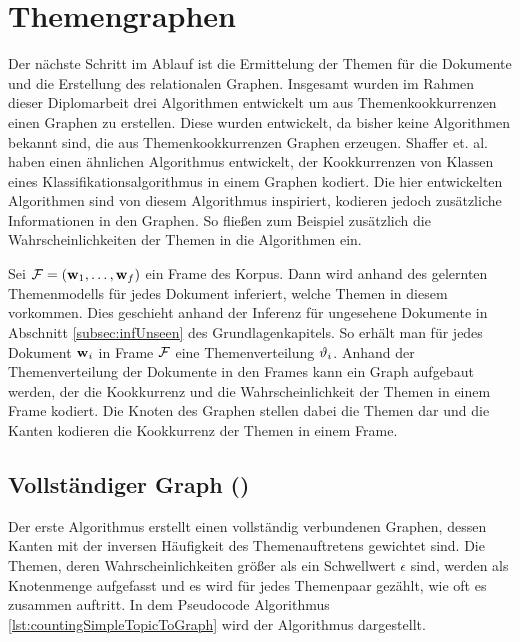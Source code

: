 	\section{Themengraphen}
\label{sec:topic2graph}
Der nächste Schritt im Ablauf ist die Ermittelung der Themen für die Dokumente und die Erstellung des relationalen Graphen. Insgesamt wurden im Rahmen dieser Diplomarbeit drei Algorithmen entwickelt um aus Themenkookkurrenzen einen Graphen zu erstellen. Diese wurden entwickelt, da bisher keine Algorithmen bekannt sind, die aus Themenkookkurrenzen Graphen erzeugen. Shaffer et. al. \citep{shafferEpistemicFrames} haben einen ähnlichen Algorithmus entwickelt, der Kookkurrenzen von Klassen eines Klassifikationsalgorithmus in einem Graphen kodiert. Die hier entwickelten Algorithmen sind von diesem Algorithmus inspiriert, kodieren jedoch zusätzliche Informationen in den Graphen. So fließen zum Beispiel zusätzlich die Wahrscheinlichkeiten der Themen in die Algorithmen ein.  

Sei $\mathcal{F}=(\mathbf{w}_1,\ldots,\mathbf{w}_f)$ ein Frame des Korpus. Dann wird anhand des gelernten Themenmodells für jedes Dokument inferiert, welche Themen in diesem vorkommen. Dies geschieht anhand der Inferenz für ungesehene Dokumente in Abschnitt \ref{subsec:infUnseen} des Grundlagenkapitels. So erhält man für jedes Dokument $\mathbf{w}_i$ in Frame $\mathcal{F}$ eine Themenverteilung $\vartheta_{i}$. Anhand der Themenverteilung der Dokumente in den Frames kann ein Graph aufgebaut werden, der die Kookkurrenz und die Wahrscheinlichkeit der Themen in einem Frame kodiert. Die Knoten des Graphen stellen dabei die Themen dar und die Kanten kodieren die Kookkurrenz der Themen in einem Frame. 

\subsection{Vollständiger Graph (\CST)}
\label{subsec:cst}
Der erste Algorithmus erstellt einen vollständig verbundenen Graphen, dessen Kanten mit der inversen Häufigkeit des Themenauftretens gewichtet sind. Die Themen, deren Wahrscheinlichkeiten größer als ein Schwellwert $\epsilon$ sind, werden als Knotenmenge aufgefasst und es wird für jedes Themenpaar gezählt, wie oft es zusammen auftritt. In dem Pseudocode Algorithmus \ref{lst:countingSimpleTopicToGraph} wird der Algorithmus dargestellt. 

